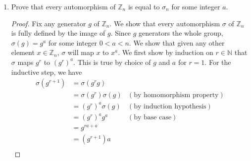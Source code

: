 \documentclass{article}
\begin{document}
\begin{enumerate}
\begin{enumerate}
\begin{enumerate}
          \item Prove that every automorphism of $\mathbb{Z}_n$ is equal to
            $\sigma_n$ for some integer $a$.
            \begin{proof}
              Fix any generator $g$ of $\mathbb{Z}_n$. We show that every
              automorphism $\sigma$ of $\mathbb{Z}_n$ is fully defined by
              the image of $g$. Since $g$ generators the whole group,
              $\sigma(g)=g^a$ for some integer $0<a<n$. We show that given
              any other element $x\in\mathbb{Z}_n$, $\sigma$ will map $x$
              to $x^a$. We first show by induction on $r\in\mathbb{N}$ that
              $\sigma$ maps $g^r$ to $(g^r)^a$. This is true by choice of
              $g$ and $a$ for $r=1$. For the inductive step, we have
              \begin{align*}
                \sigma(g^{r+1}) &= \sigma(g^rg) \\
                                &= \sigma(g^r)\sigma(g) & (\text{by
                                homomorphism property}) \\
                                &= (g^r)^a\sigma(g)     & (\text{by induction
                                hypothesis}) \\
                                &= (g^r)^ag^a           & (\text{by
                                base case}) \\
                                &= g^{ra+a}             & \\
                                &= (g^{r+1})a           & \\
              \end{align*}
            \end{proof}
        \end{enumerate}
    \end{enumerate}


\end{enumerate}
\end{document}
